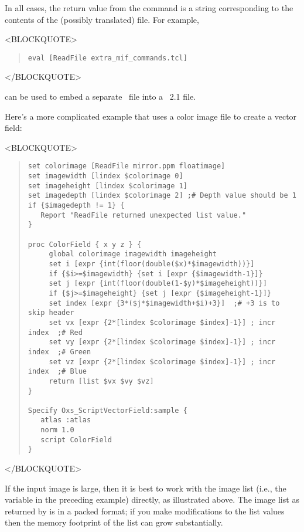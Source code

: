 \begin{description}
In all cases, the return value from the  command is a
string corresponding to the contents of the (possibly translated) file.
For example,
\begin{rawhtml}<BLOCKQUOTE>\end{rawhtml}
\begin{quote}
\begin{verbatim}
eval [ReadFile extra_mif_commands.tcl]
\end{verbatim}
\end{quote}
\begin{rawhtml}</BLOCKQUOTE>\end{rawhtml}
can be used to embed a separate \Tcl\ file into a \MIF~2.1 file.

%
Here's a more complicated example that uses a color image file to
create a vector field:
\begin{rawhtml}<BLOCKQUOTE>\end{rawhtml}
\begin{quote}
\begin{verbatim}
set colorimage [ReadFile mirror.ppm floatimage]
set imagewidth [lindex $colorimage 0]
set imageheight [lindex $colorimage 1]
set imagedepth [lindex $colorimage 2] ;# Depth value should be 1
if {$imagedepth != 1} {
   Report "ReadFile returned unexpected list value."
}

proc ColorField { x y z } {
     global colorimage imagewidth imageheight
     set i [expr {int(floor(double($x)*$imagewidth))}]
     if {$i>=$imagewidth} {set i [expr {$imagewidth-1}]}
     set j [expr {int(floor(double(1-$y)*$imageheight))}]
     if {$j>=$imageheight} {set j [expr {$imageheight-1}]}
     set index [expr {3*($j*$imagewidth+$i)+3}]  ;# +3 is to skip header
     set vx [expr {2*[lindex $colorimage $index]-1}] ; incr index  ;# Red
     set vy [expr {2*[lindex $colorimage $index]-1}] ; incr index  ;# Green
     set vz [expr {2*[lindex $colorimage $index]-1}] ; incr index  ;# Blue
     return [list $vx $vy $vz]
}

Specify Oxs_ScriptVectorField:sample {
   atlas :atlas
   norm 1.0
   script ColorField
}
\end{verbatim}
\end{quote}
\begin{rawhtml}</BLOCKQUOTE>\end{rawhtml}
If the input image is large, then it is best to work with the image list
(i.e., the variable  in the preceding example) directly,
as illustrated above.  The image list as returned by  is in
a packed format; if you make modifications to the list values then the
memory footprint of the list can grow substantially.


\end{description}
